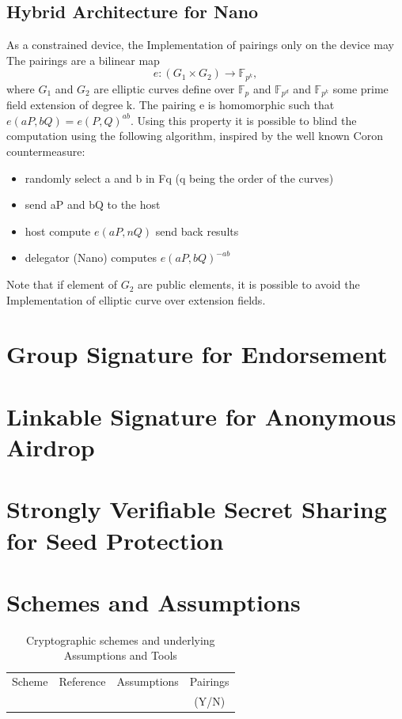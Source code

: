 \documentclass[11pt]{llncs2e/llncs}
\begin{document}
\subsection{Hybrid Architecture for Nano}
As a constrained device, the Implementation of pairings only on the device may 
The pairings are a bilinear map $$e:(G_1 \times G_2) \rightarrow \mathbb{F}_{p^k}, $$ where $G_1$ and $G_2$ are elliptic curves define over $\mathbb{F}_p$ and $\mathbb{F}_{p^d}$ and $\mathbb{F}_{p^k}$ some prime field extension of degree k. The pairing e is homomorphic such that $e(aP, bQ)=e(P,Q)^{ab}$. Using this property it is possible to blind the computation using the following algorithm, inspired by the well known Coron countermeasure:
\begin{itemize}
 \item randomly select a and b in Fq (q being the order of the curves)
 \item send aP and bQ to the host
\item host compute $e(aP,nQ)$ send back results
\item delegator (Nano) computes $e(aP, bQ)^{-ab}$
\end{itemize}
Note that if element of $G_2$ are public elements, it is possible to avoid the Implementation of elliptic curve over extension fields.

\section{Group Signature for Endorsement}


\section{Linkable Signature for Anonymous Airdrop}

 
  
\section{Strongly Verifiable Secret Sharing for Seed Protection}

\section{Schemes and Assumptions}

\begin{table}
\begin{center}
 
 \begin{tabular}{|c|c|c|c|}
 \hline
 Scheme & Reference & Assumptions & Pairings \\
   &&& (Y/N)\\ 
 \hline
 \end{tabular}
\end{center}
\caption{Cryptographic schemes and underlying Assumptions and Tools}
\end{table}
\end{document}
